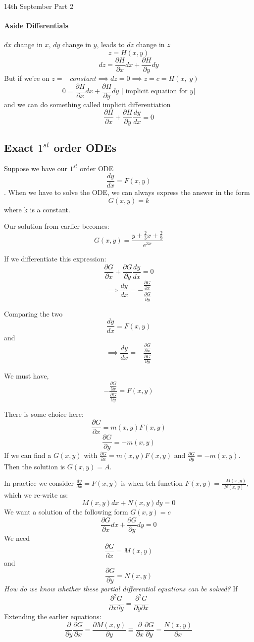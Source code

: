 \documentclass[11pt]{article}
\theoremstyle{definition}
\begin{document}
\begin{center}
    {\LARGE 14th September Part 2}\\
\end{center}

\paragraph{Aside Differentials}
$dx$ change in $x$, $dy$ change in $y$, leads to $dz$ change in $z$
$$z = H(x,y)$$
$$dz = \frac{\partial H}{\partial x}dx + \frac{\partial H}{\partial y} dy$$
But if we're on $z =\;\;\; constant \implies dz = 0 \implies z = c = H(x,\;y)$
$$0 = \frac{\partial H}{\partial x}dx + \frac{\partial H}{\partial y} dy \text{ [         implicit equation for } y]$$ and we can do something called implicit differentiation
$$\frac{\partial H}{\partial x} + \frac{\partial H}{\partial y} \frac{dy}{dx} = 0$$


\subsection{Exact $1^{st}$ order ODEs}
Suppose we have our $1^{st}$ order ODE $$\frac{dy}{dx} = F(x,y)$$. When we have to solve the ODE, we can always express the answer in the form $$G(x,y) = k$$ where k is a constant.

Our solution from earlier becomes: $$G(x,y) = \frac{y + \frac{2}{3}x + \frac{2}{9}}{e^{3x}}$$

If we differentiate this expression:
$$\frac{\partial G}{\partial x} + \frac{\partial G}{\partial y}\frac{dy}{dx} = 0$$
$$\implies \frac{dy}{dx} = -\frac{\frac{\partial G}{\partial x}}{ \frac{\partial G}{\partial y}}$$

Comparing the two $$\frac{dy}{dx} = F(x,y)$$ and $$\implies \frac{dy}{dx} = -\frac{\frac{\partial G}{\partial x}}{ \frac{\partial G}{\partial y}}$$

We must have, $$-\frac{\frac{\partial G}{\partial x}}{ \frac{\partial G}{\partial y}} = F(x,y)$$

There is some choice here:
$$\frac{\partial G}{\partial x} = m(x,y)F(x,y)$$
$$\frac{\partial G}{\partial y} = -m(x,y)$$
If we can find a $G(x,y)$ with $\frac{\partial G}{\partial x} = m(x,y)F(x,y)$ and
$\frac{\partial G}{\partial y} = -m(x,y)$. Then the solution is $G(x,y) = A$.

In practice we consider $\frac{dy}{dx} = F(x,y)$ is when teh function $F(x,y) = \frac{-M(x,y)}{N(x,y)}$, which we re-write as: $$M(x,y)dx + N(x,y)dy = 0$$
We want a solution of the following form $G(x,y) = c$
$$\frac{\partial G}{\partial x}dx + \frac{\partial G}{\partial y} dy = 0$$
We need         $$\frac{\partial G}{\partial x} = M(x,y)$$ and $$\frac{\partial G}{\partial y} = N(x,y)$$
\textit{How do we know whether these partial differential equations can be solved?}
If
$$\frac{\partial^2G}{\partial x \partial y} = \frac{\partial^2G}{\partial y \partial x}$$
Extending the earlier equations:
$$\frac{\partial }{\partial y}\frac{\partial G}{\partial x} = \frac{\partial M(x,y)}{\partial y} \equiv \frac{\partial }{\partial x}\frac{\partial G}{\partial y} = \frac{N(x,y)}{\partial x}$$
\end{document}
